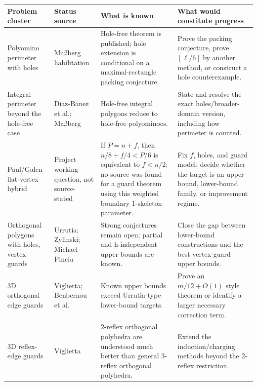 \documentclass[11pt]{article}
\newcommand{\floor}[1]{\left\lfloor #1 \right\rfloor}
\begin{document}
\begin{table}[!t]
\small
\setlength{\tabcolsep}{3pt}
\renewcommand{\arraystretch}{1.12}
\begin{tabularx}{\textwidth}{
  >{\raggedright\arraybackslash}p{}
  >{\raggedright\arraybackslash}p{}
  Y
  Y}
\toprule
Problem cluster & Status source & What is known & What would constitute progress \\
\midrule
Polyomino perimeter with holes &
Ma{\ss}berg habilitation \cite[Conj.~6.10]{MassbergHabilitation} &
Hole-free theorem is published; hole extension is conditional on a
maximal-rectangle packing conjecture. &
Prove the packing conjecture, prove $\floor{\ell/6}$ by another method, or
construct a hole counterexample. \\

Integral perimeter beyond the hole-free case &
Diaz-Banez et al.; Ma{\ss}berg \cite{DiazBanezEtAl2025,Massberg2014} &
Hole-free integral polygons reduce to hole-free polyominoes. &
State and resolve the exact holes/broader-domain version, including how
perimeter is counted. \\

Paul/Galen flat-vertex hybrid &
Project working question, not source-stated &
If $P=n+f$, then $n/8+f/4<P/6$ is equivalent to $f<n/2$; no source was found
for a guard theorem using this weighted boundary 1-skeleton parameter. &
Fix $f$, holes, and guard model; decide whether the target is an upper bound,
lower-bound family, or improvement regime. \\

Orthogonal polygons with holes, vertex guards &
Urrutia; Zylinski; Michael--Pinciu
\cite{UrrutiaOpenProblems,Zylinski2006,MichaelPinciu2016} &
Strong conjectures remain open; partial and h-independent upper bounds are
known. &
Close the gap between lower-bound constructions and the best vertex-guard
upper bounds. \\

3D orthogonal edge guards &
Viglietta; Benbernou et al. \cite{VigliettaThesis,BenbernouEtAl2011} &
Known upper bounds exceed Urrutia-type lower-bound targets. &
Prove an $m/12+O(1)$ style theorem or identify a larger necessary correction
term. \\

3D reflex-edge guards &
Viglietta \cite{Viglietta2020} &
2-reflex orthogonal polyhedra are understood much better than general
3-reflex orthogonal polyhedra. &
Extend the induction/charging methods beyond the 2-reflex restriction. \\


\end{tabularx}
\end{table}
\end{document}
